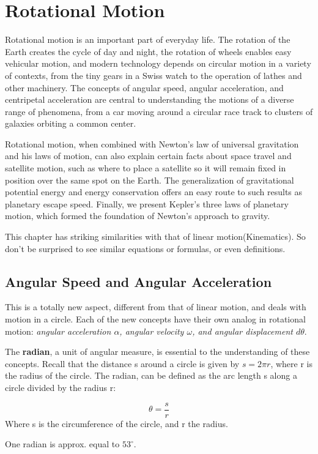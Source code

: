 \section{Rotational Motion}
Rotational motion is an important part of everyday life. The rotation of the Earth creates the cycle of day and night, the rotation of wheels enables easy vehicular motion, and modern technology depends on circular motion in a variety of contexts, from the tiny gears in a Swiss watch to the operation of lathes and other machinery. The concepts of angular speed, angular acceleration, and centripetal acceleration are central to understanding the motions of a diverse
range of phenomena, from a car moving around a circular race track to clusters of galaxies orbiting a common center.
 
Rotational motion, when combined with Newton's law of universal gravitation and his laws of motion, can also explain certain facts about space travel and satellite motion, such as where to place a satellite so it will remain fixed in position over the same spot on the Earth. The generalization of gravitational potential energy and energy conservation offers an easy route to such results as planetary escape speed. Finally, we present Kepler's three laws of planetary motion, which formed the foundation of Newton's approach to gravity.

This chapter has striking similarities with that of linear motion(Kinematics). So don't be surprised to see similar equations or formulas, or even definitions.

\subsection{Angular Speed and Angular Acceleration}
This is a totally new aspect, different from that of linear motion, and deals with motion in a circle. Each of the new concepts have their own analog in rotational motion: \emph{angular acceleration $\alpha$, angular velocity $\omega$,  and angular displacement $d \theta$}.

The \textbf{radian}, a unit of angular measure, is essential to the understanding of these concepts. Recall that the distance s around a circle is given by $s=2\pi r$, where r is the radius of the circle. The radian, can be defined as the arc length s along a circle divided by the radius r:
\begin{defi}
$$\theta = \frac{s}{r}$$
Where s is the circumference of the circle, and r the radius.
\end{defi}
One radian is approx. equal to $53^\circ$.

